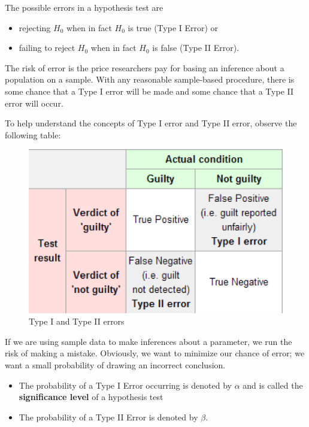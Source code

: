 \documentclass[12pt, krantz2,]{krantz}
\providecommand{\tightlist}{%
  \setlength{\itemsep}{0pt}\setlength{\parskip}{0pt}}
\begin{document}
The possible errors in a hypothesis test are

\begin{itemize}
\tightlist
\item
  rejecting \(H_0\) when in fact \(H_0\) is true (Type I Error) or
\item
  failing to reject \(H_0\) when in fact \(H_0\) is false (Type II Error).
\end{itemize}

The risk of error is the price researchers pay for basing an inference about a population on a sample. With any reasonable sample-based procedure, there is some chance that a Type I error will be made and some chance that a Type II error will occur.

To help understand the concepts of Type I error and Type II error, observe the following table:

\begin{figure}

{\centering \includegraphics[width=\textwidth]{images/errors} 

}

\caption{Type I and Type II errors}\label{fig:unnamed-chunk-341}
\end{figure}

If we are using sample data to make inferences about a parameter, we run the risk of making a mistake. Obviously, we want to minimize our chance of error; we want a small probability of drawing an incorrect conclusion.

\begin{itemize}
\tightlist
\item
  The probability of a Type I Error occurring is denoted by \(\alpha\) and is called the \textbf{significance level} of a hypothesis test
\item
  The probability of a Type II Error is denoted by \(\beta\).
\end{itemize}
\end{document}
